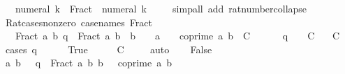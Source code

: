 \begin{isabellebody}
\ \ {\isachardoublequoteopen}{\isacharminus}{\kern0pt}\ numeral\ k\ {\isacharequal}{\kern0pt}\ Fract\ {\isacharparenleft}{\kern0pt}{\isacharminus}{\kern0pt}\ numeral\ k{\isacharparenright}{\kern0pt}\ {}{\isachardoublequoteclose}\isanewline
%
\isadelimproof
\ \ %
\endisadelimproof
%
\isatagproof
{}\isamarkupfalse%
\ {\isacharparenleft}{\kern0pt}simp{\isacharunderscore}{\kern0pt}all\ add{\isacharcolon}{\kern0pt}\ rat{\isacharunderscore}{\kern0pt}number{\isacharunderscore}{\kern0pt}collapse{\isacharparenright}{\kern0pt}%
\endisatagproof
{\isafoldproof}%
%
\isadelimproof
\isanewline
%
\endisadelimproof
\isanewline
{}\isamarkupfalse%
\ Rat{\isacharunderscore}{\kern0pt}cases{\isacharunderscore}{\kern0pt}nonzero\ {\isacharbrackleft}{\kern0pt}case{\isacharunderscore}{\kern0pt}names\ Fract\ {}{\isacharbrackright}{\kern0pt}{\isacharcolon}{\kern0pt}\isanewline
\ \ \ Fract{\isacharcolon}{\kern0pt}\ {\isachardoublequoteopen}{\isasymAnd}a\ b{\isachardot}{\kern0pt}\ q\ {\isacharequal}{\kern0pt}\ Fract\ a\ b\ {\isasymLongrightarrow}\ b\ {\isachargreater}{\kern0pt}\ {}\ {\isasymLongrightarrow}\ a\ {\isasymnoteq}\ {}\ {\isasymLongrightarrow}\ coprime\ a\ b\ {\isasymLongrightarrow}\ C{\isachardoublequoteclose}\isanewline
\ \ \ \ \ {}{\isacharcolon}{\kern0pt}\ {\isachardoublequoteopen}q\ {\isacharequal}{\kern0pt}\ {}\ {\isasymLongrightarrow}\ C{\isachardoublequoteclose}\isanewline
\ \ \ C\isanewline
%
\isadelimproof
%
\endisadelimproof
%
\isatagproof
{}\isamarkupfalse%
\ {\isacharparenleft}{\kern0pt}cases\ {\isachardoublequoteopen}q\ {\isacharequal}{\kern0pt}\ {}{\isachardoublequoteclose}{\isacharparenright}{\kern0pt}\isanewline
\ \ \isamarkupfalse%
\ True\isanewline
\ \ \isamarkupfalse%
\ \isamarkupfalse%
\ C\ \isamarkupfalse%
\ {}\ \isamarkupfalse%
\ auto\isanewline
{}\isamarkupfalse%
\isanewline
\ \ \isamarkupfalse%
\ False\isanewline
\ \ \isamarkupfalse%
\ \isamarkupfalse%
\ a\ b\ \ {\isacharasterisk}{\kern0pt}{\isacharcolon}{\kern0pt}\ {\isachardoublequoteopen}q\ {\isacharequal}{\kern0pt}\ Fract\ a\ b{\isachardoublequoteclose}\ {\isachardoublequoteopen}b\ {\isachargreater}{\kern0pt}\ {}{\isachardoublequoteclose}\ {\isachardoublequoteopen}coprime\ a\ b{\isachardoublequoteclose}\isanewline
\ \ \ \ \isamarkupfalse%

\end{isabellebody}
